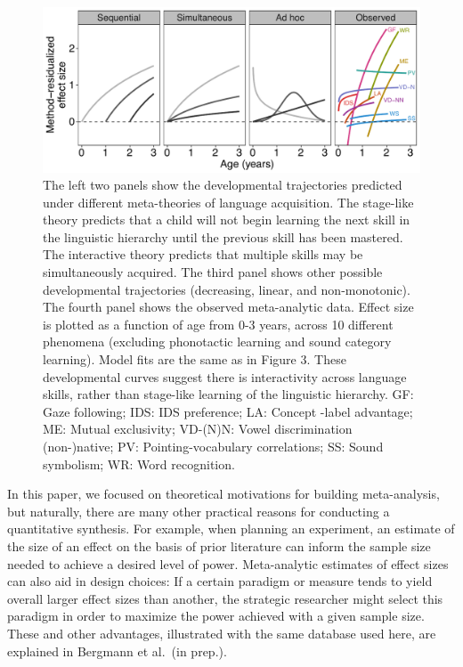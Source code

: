 \documentclass[9pt,twocolumn,twoside,lineno]{pnas-new}
\begin{document}
\begin{figure}[t!]
\centering
\includegraphics[width=17.3cm]{figs/fig4_lab.pdf}
\caption{The left two panels show the developmental trajectories
predicted under different meta-theories of language acquisition. The
stage-like theory predicts that a child will not begin learning the next
skill in the linguistic hierarchy until the previous skill has been
mastered. The interactive theory predicts that multiple skills may be
simultaneously acquired. The third panel shows other possible
developmental trajectories (decreasing, linear, and non-monotonic). The
fourth panel shows the observed meta-analytic data. Effect size is
plotted as a function of age from 0-3 years, across 10 different
phenomena (excluding phonotactic learning and sound category learning).
Model fits are the same as in Figure 3. These developmental curves
suggest there is interactivity across language skills, rather than
stage-like learning of the linguistic hierarchy. GF: Gaze following; IDS: IDS preference; LA: Concept -label advantage; ME: Mutual exclusivity; VD-(N)N: Vowel discrimination (non-)native; PV: Pointing-vocabulary correlations; SS: Sound symbolism; WR: Word recognition.}
\end{figure}

In this paper, we focused on theoretical motivations for building
meta-analysis, but naturally, there are many other practical reasons for
conducting a quantitative synthesis. For example, when planning an
experiment, an estimate of the size of an effect on the basis of prior
literature can inform the sample size needed to achieve a desired level
of power. Meta-analytic estimates of effect sizes can also aid in design
choices: If a certain paradigm or measure tends to yield overall larger
effect sizes than another, the strategic researcher might select this
paradigm in order to maximize the power achieved with a given sample
size. These and other advantages, illustrated with the same database
used here, are explained in Bergmann et al.~(in prep.).
\end{document}
